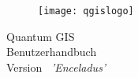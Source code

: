 
\begin{titlepage}
\begin{center}

\begin{figure}[H]
\begin{center}
\texttt{[image: qgislogo]} 
\end{center}
\end{figure}

\Huge{Quantum GIS}\\
\vspace{0.5cm}
\Large{Benutzerhandbuch} \\
\vspace{0.5cm}
\Large{Version ~\CURRENT \textsl{'Enceladus'}}

\end{center}
\end{titlepage}

